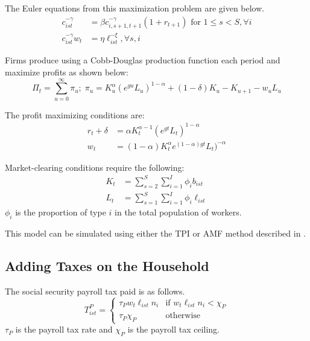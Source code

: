 \documentclass[letterpaper,12pt]{article}
\theoremstyle{definition}
\numberwithin{equation}{section}
\begin{document}
\begin{spacing}{1.5}
    The Euler equations from this maximization problem are given below.
    \begin{align}
    c_{ist}^{-\gamma} & = \beta c_{i,s+1,t+1}^{-\gamma}(1+r_{t+1}) \text{     for } 1\le s<S,\forall i \\
    c_{ist}^{-\gamma} w_t & = \eta \ell_{ist}^{-\xi}, \forall s,i
    \end{align}

    Firms produce using a Cobb-Douglas production function each period and maximize profits as shown below:
    \begin{equation}
    \Pi_t = \sum_{u=0}^{\infty} \pi_u;\; \pi_u = K_u^\alpha (e^{gu}L_u)^{1-\alpha} + (1-\delta)K_u - K_{u+1} - w_uL_u
    \end{equation}

    The profit maximizing conditions are:
    \begin{align}
    r_t + \delta & = \alpha K_t^{\alpha-1}(e^{gt}L_t)^{1-\alpha} \\
    w_t & = (1-\alpha) K_t^{\alpha}e^{(1-\alpha)gt}L_t)^{-\alpha}
    \end{align}

    Market-clearing conditions require the following:
    \begin{align}
    K_t & = \sum_{s=2}^S \sum_{i=1}^I \phi_i b_{ist} \\
    L_t & = \sum_{s=1}^S \sum_{i=1}^I \phi_i \ell_{ist}
    \end{align}
    $\phi_i$ is the proportion of type $i$ in the total population of workers.

    This model can be simulated using either the TPI or AMF method described in \citet{EvansPhillips2014}.

  \subsection{Adding Taxes on the Household}
    The social security payroll tax paid is as follows.
    \begin{equation}
    T^P_{ist} = \left\{ \begin{matrix} \tau_P w_t \ell_{ist} n_i & \text{if } w_t \ell_{ist} n_i < \chi_P \\
                                        \tau_P \chi_P & \text{otherwise} \end{matrix} \right.
    \end{equation}
    $\tau_P$ is the payroll tax rate and $\chi_P$ is the payroll tax ceiling.


\end{spacing}
\end{document}

